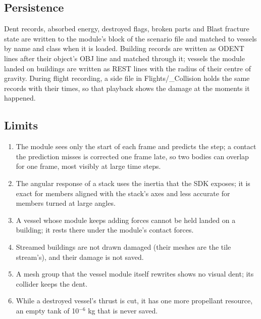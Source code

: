 \documentclass[Orbiter Technical Reference.tex]{subfiles}
\begin{document}
\subsection{Persistence}
Dent records, absorbed energy, destroyed flags, broken parts and Blast fracture state are written to the module's block of the scenario file and matched to vessels by name and class when it is loaded. Building records are written as ODENT lines after their object's OBJ line and matched through it; vessels the module landed on buildings are written as REST lines with the radius of their centre of gravity. During flight recording, a side file in Flights/\_Collision holds the same records with their times, so that playback shows the damage at the moments it happened.


\subsection{Limits}
\begin{enumerate}
\item The module sees only the start of each frame and predicts the step; a contact the prediction misses is corrected one frame late, so two bodies can overlap for one frame, most visibly at large time steps.
\item The angular response of a stack uses the inertia that the SDK exposes; it is exact for members aligned with the stack's axes and less accurate for members turned at large angles.
\item A vessel whose module keeps adding forces cannot be held landed on a building; it rests there under the module's contact forces.
\item Streamed buildings are not drawn damaged (their meshes are the tile stream's), and their damage is not saved.
\item A mesh group that the vessel module itself rewrites shows no visual dent; its collider keeps the dent.
\item While a destroyed vessel's thrust is cut, it has one more propellant resource, an empty tank of 10$^{-6}$ kg that is never saved.
\end{enumerate}
\end{document}
